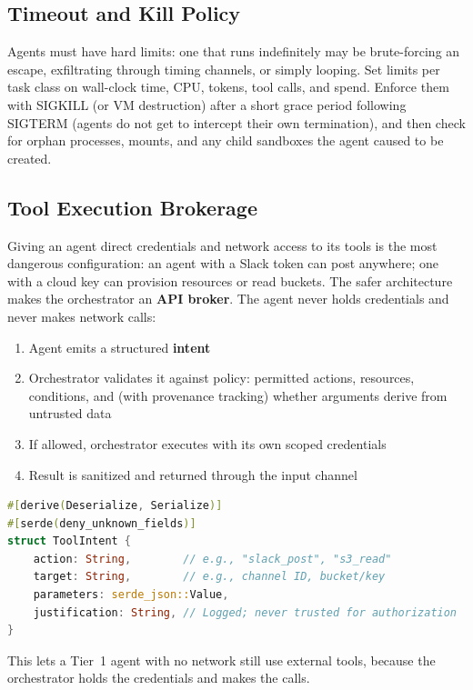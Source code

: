 \documentclass[11pt,letterpaper]{article}
\begin{document}
\subsection{Timeout and Kill Policy}

Agents must have hard limits: one that runs indefinitely may be brute-forcing an escape, exfiltrating through timing channels, or simply looping. Set limits per task class on wall-clock time, CPU, tokens, tool calls, and spend. Enforce them with SIGKILL (or VM destruction) after a short grace period following SIGTERM (agents do not get to intercept their own termination), and then check for orphan processes, mounts, and any child sandboxes the agent caused to be created.

\subsection{Tool Execution Brokerage}
\label{sec:broker}

Giving an agent direct credentials and network access to its tools is the most dangerous configuration: an agent with a Slack token can post anywhere; one with a cloud key can provision resources or read buckets. The safer architecture makes the orchestrator an \textbf{API broker}. The agent never holds credentials and never makes network calls:

\begin{enumerate}
  \item Agent emits a structured \textbf{intent}
  \item Orchestrator validates it against policy: permitted actions, resources, conditions, and (with provenance tracking) whether arguments derive from untrusted data
  \item If allowed, orchestrator executes with its own scoped credentials
  \item Result is sanitized and returned through the input channel
\end{enumerate}

\begin{lstlisting}[language=rust]
#[derive(Deserialize, Serialize)]
#[serde(deny_unknown_fields)]
struct ToolIntent {
    action: String,        // e.g., "slack_post", "s3_read"
    target: String,        // e.g., channel ID, bucket/key
    parameters: serde_json::Value,
    justification: String, // Logged; never trusted for authorization
}
\end{lstlisting}

This lets a Tier~1 agent with no network still use external tools, because the orchestrator holds the credentials and makes the calls.
\end{document}
